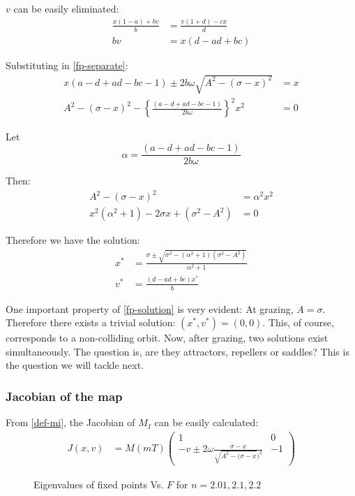 \documentclass[oneside]{book}
\renewcommand{\(}{\begin{columns}}
\renewcommand{\)}{\end{columns}}
\newcommand{\<}[1]{\begin{column}{#1}}
\renewcommand{\>}{\end{column}}
\begin{document}
$v$ can be easily eliminated:
\begin{align*}
\frac{x(1-a)+bv}{b}&=\frac{v(1+d)-cx}{d}\\
bv&=x(d-ad+bc)
\end{align*}

Substituting in \eqref{fp-separate}:
\begin{align*}
x(a-d+ad-bc-1)\pm 2b\omega\sqrt{A^2-(\sigma-x)^2}&=x\\
A^2-(\sigma-x)^2-\left\{\frac{(a-d+ad-bc-1)}{2b\omega}\right\}^2x^2&=0
\end{align*}


Let \[
\alpha=\frac{(a-d+ad-bc-1)}{2b\omega}
\]

Then:
\begin{align*}
A^2-(\sigma-x)^2&=\alpha^2x^2\\
x^2(\alpha^2+1)-2\sigma x+(\sigma^2-A^2)&=0
\end{align*}

Therefore we have the solution:
\begin{align}
\label{fp-solution}
x^*&=\frac{\sigma\pm\sqrt{\sigma^2-(\alpha^2+1)(\sigma^2-A^2)}}{\alpha^2+1}\\
v^*&=\frac{(d-ad+bc)x^*}{b}
\end{align}


One important property of  \eqref{fp-solution} is very evident:
At grazing, $A=\sigma$.  Therefore there exists a trivial solution: 
$(x^*,v^*)=(0,0)$.  This, of course, corresponds to a non-colliding orbit.  
Now, after grazing, two solutions exist simultaneously.  The question is, 
are they attractors, repellers or saddles? This is the question we will tackle 
next.  


\subsubsection{Jacobian of the map}
From \eqref{def-mi}, the Jacobian of $M_I$ can be easily calculated:
\begin{align}
\label{eq-jac-mi}
J(x,v)&=M(mT)
\begin{pmatrix}
1 & 0\\
-v\pm2\omega \frac{\sigma-x}{\sqrt{A^2-(\sigma-x})^2} & -1
\end{pmatrix}
\end{align}

\begin{figure}[!htp]
\begin{center}
\caption{Eigenvalues of fixed points Vs.  $F$ for $n=2.01,2.1,2.2$}
\label{fig-eigs-F}
\def\svgwidth{\columnwidth}

\end{center}
\end{figure}
\end{document}
